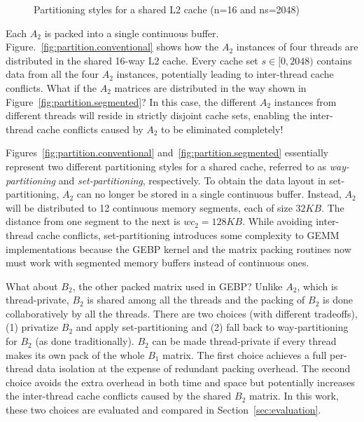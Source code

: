 \begin{figure}
  \centering
  \caption{Partitioning styles for a shared L2 cache (n=16 and ns=2048)}
  \label{fig:partition}
\end{figure}

Each $A_2$ is packed into a single continuous buffer.
Figure.~\ref{fig:partition.conventional} shows how the
$A_2$ instances of four threads are distributed in the shared 16-way L2 cache.
Every cache set $s \in [0,2048)$ contains
data from all the four $A_2$ instances,
potentially leading to inter-thread cache conflicts.
What if the $A_2$ matrices are distributed in the way shown in
Figure~\ref{fig:partition.segmented}? In this case,
the different $A_2$ instances from different threads will
reside in strictly disjoint cache sets, enabling
the inter-thread cache conflicts caused by $A_2$ to be
eliminated completely!

Figures~\ref{fig:partition.conventional} and~\ref{fig:partition.segmented}
essentially represent two different partitioning styles for a shared cache,
referred to as \emph{way-partitioning} and \emph{set-partitioning}, respectively.
To obtain the data layout in set-partitioning,
$A_2$ can no longer be stored in a single continuous buffer.
Instead, $A_2$ will be distributed to 12 continuous memory segments, each of size $32KB$.
The distance from one segment to the next is $wc_2=128KB$.
While avoiding inter-thread cache conflicts,
set-partitioning
introduces some complexity to GEMM implementations
because the GEBP kernel and the matrix packing routines
now must work with segmented memory buffers instead of continuous ones.

What about $B_2$, the other packed matrix used in GEBP?
Unlike $A_2$, which is thread-private,
$B_2$ is shared among all the threads and
the packing of $B_2$ is done collaboratively by all
the threads.
There are two choices (with different tradeoffs), (1) privatize $B_2$ and apply 
set-partitioning and (2) 
fall back to way-partitioning for $B_2$ (as done
traditionally).
$B_2$ can be made thread-private if every thread makes
its own pack of the whole $B_1$ matrix.
The first choice achieves a full per-thread data isolation
at the expense of redundant packing overhead.
The second choice avoids the extra overhead in both time and space
but potentially increases the inter-thread cache
conflicts caused
by the shared $B_2$ matrix.
In this work, these two choices are evaluated
and compared in Section~\ref{sec:evaluation}.


